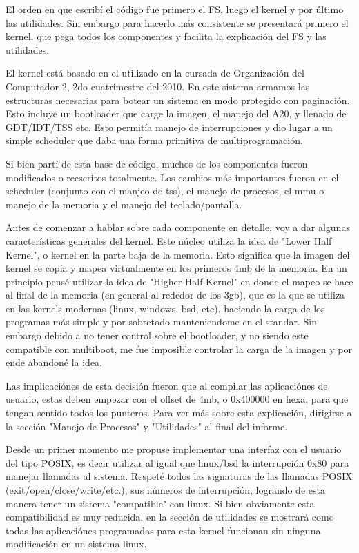 El orden en que escribí el código fue primero el FS, luego el kernel y por
último las utilidades. Sin embargo para hacerlo más consistente se presentará
primero el kernel, que pega todos los componentes y facilita la explicación del
FS y las utilidades.

El kernel está basado en el utilizado en la cursada de Organización del
Computador 2, 2do cuatrimestre del 2010. En este sistema armamos las
estructuras necesarias para botear un sistema en modo protegido con paginación.
Esto incluye un bootloader que carge la imagen, el manejo del A20, y llenado de
GDT/IDT/TSS etc. Esto permitía manejo de interrupciones y dio lugar a un simple
scheduler que daba una forma primitiva de multiprogramación.

Si bien partí de esta base de código, muchos de los componentes fueron
modificados o reescritos totalmente. Los cambios más importantes fueron en el
scheduler (conjunto con el manjeo de tss), el manejo de procesos, el mmu o
manejo de la memoria y el manejo del teclado/pantalla.

Antes de comenzar a hablar sobre cada componente en detalle, voy a dar algunas
características generales del kernel. Este núcleo utiliza la idea de "Lower
Half Kernel", o kernel en la parte baja de la memoria. Esto significa que la
imagen del kernel se copia y mapea virtualmente en los primeros 4mb de la
memoria. En un principio pensé utilizar la idea de "Higher Half Kernel" en
donde el mapeo se hace al final de la memoria (en general al rededor de los
3gb), que es la que se utiliza en las kernels modernas (linux, windows, bsd,
etc), haciendo la carga de los programas más simple y por sobretodo
manteniendome en el standar. Sin embargo debido a no tener control sobre el
bootloader, y no siendo este compatible con multiboot, me fue imposible
controlar la carga de la imagen y por ende abandoné la idea.

Las implicaciónes de esta decisión fueron que al compilar las aplicaciónes de
usuario, estas deben empezar con el offset de 4mb, o 0x400000 en hexa, para que
tengan sentido todos los punteros. Para ver más sobre esta explicación,
dirigirse a la sección "Manejo de Procesos" y "Utilidades" al final del
informe.

Desde un primer momento me propuse implementar una interfaz con el usuario del
tipo POSIX, es decir utilizar al igual que linux/bsd la interrupción 0x80 para
manejar llamadas al sistema. Respeté todos las signaturas de las llamadas POSIX
(exit/open/close/write/etc.), sus números de interrupción, logrando de esta
manera tener un sistema "compatible" con linux. Si bien obviamente esta
compatibilidad es muy reducida, en la sección de utilidades se mostrará como
todas las aplicaciónes programadas para esta kernel funcionan sin ninguna
modificación en un sistema linux.

